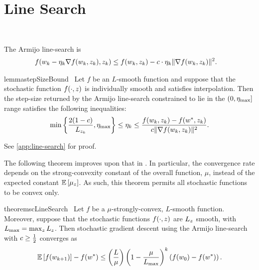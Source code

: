 
\chapter{Line Search}~\label{ch:line-search}

The Armijo line-search is 
\begin{align}
    f(w_k - \eta_k \nabla f(w_k, z_{k}), z_{k}) &\leq f(w_k, z_{k}) - c \cdot \eta_k \|\nabla f(w_k, z_{k})\|^2. \label{eq:armijo-ls}
\end{align}

\begin{restatable}{lemma}{stepSizeBound}~\label{lemma:step-size-bound}
    Let \( f \) be an \( L \)-smooth function and suppose that the stochastic function \( f(\cdot, z) \) is individually smooth and satisfies interpolation.
    Then the step-size returned by the Armijo line-search constrained to lie in the \( (0, \eta_{\text{max}}] \) range satisfies the following inequalities:
    \[ \min\left\{\frac{2 (1-c)}{L_{z_{k}}}, \eta_{\text{max}}\right\} \leq \eta_k \leq \frac{f(w_k, z_{k}) - f(w^*, z_{k})}{c \|\nabla f(w_k, z_{k})\|^2}. \]
\end{restatable}

See \autoref{app:line-search} for proof.

The following theorem improves upon that in \citet{vaswani2019painless}.
In particular, the convergence rate depends on the strong-convexity constant of the overall function, \( \mu \), instead of the expected constant \( \mathbb{E} \left[\mu_z\right] \).
As such, this theorem permits all stochastic functions to be convex only.

\begin{restatable}{theorem}{scLineSearch}~\label{thm:sc-line-search}
    Let \( f \) be a \( \mu \)-strongly-convex, \( L \)-smooth function.
    Moreover, suppose that the stochastic functions \( f(\cdot, z) \) are \( L_z \) smooth, with \( L_{\text{max}} = \max_z L_z \). 
    Then stochastic gradient descent using the Armijo line-search with \( c \geq \frac 1 2 \) converges as 
    \[ \mathbb{E}\left[f(w_{k+1})\right] - f(w^*) \leq \left(\frac{L}{\mu}\right)\left(1 - \frac{\mu}{L_{\text{max}}}\right)^k\left(f(w_0) - f(w^*)\right). \]
\end{restatable}
